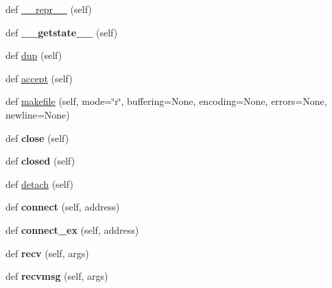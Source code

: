 \begin{DoxyCompactItemize}
\item 
def \hyperlink{classgevent_1_1__socket3_1_1socket_af7d8a881006707e5f430633451590076}{\+\_\+\+\_\+repr\+\_\+\+\_\+} (self)
\item 
\mbox{\label{classgevent_1_1__socket3_1_1socket_abb2955a3b242e4a03c00a5da09826d1f}} 
def {\bfseries \+\_\+\+\_\+getstate\+\_\+\+\_\+} (self)
\item 
def \hyperlink{classgevent_1_1__socket3_1_1socket_a1df6586b8907e0a991c9fd041de0d233}{dup} (self)
\item 
def \hyperlink{classgevent_1_1__socket3_1_1socket_a651a6acb24b19f45b771aa7523879ea2}{accept} (self)
\item 
def \hyperlink{classgevent_1_1__socket3_1_1socket_aa5ae7dea6c94a0167197e2921f6d21d8}{makefile} (self, mode=\char`\"{}r\char`\"{}, buffering=None, encoding=None, errors=None, newline=None)
\item 
\mbox{\label{classgevent_1_1__socket3_1_1socket_a6fb6430169057cbba2c54dd2f5085bee}} 
def {\bfseries close} (self)
\item 
\mbox{\label{classgevent_1_1__socket3_1_1socket_ab7305969e5b7624f3403e3d4eaf63c60}} 
def {\bfseries closed} (self)
\item 
def \hyperlink{classgevent_1_1__socket3_1_1socket_a728f323e3a7940a04ce429fa110e889b}{detach} (self)
\item 
\mbox{\label{classgevent_1_1__socket3_1_1socket_afcfd1a9631006e47ea6eaabb3a9c682a}} 
def {\bfseries connect} (self, address)
\item 
\mbox{\label{classgevent_1_1__socket3_1_1socket_a6660577ff0ca9c953c43767dec6f8f1b}} 
def {\bfseries connect\+\_\+ex} (self, address)
\item 
\mbox{\label{classgevent_1_1__socket3_1_1socket_ac785637cb95edd256722022a942eebab}} 
def {\bfseries recv} (self, args)
\item 
\mbox{\label{classgevent_1_1__socket3_1_1socket_aa05e33df9d07f7b279357590017b6afa}} 
def {\bfseries recvmsg} (self, args)

\end{DoxyCompactItemize}
